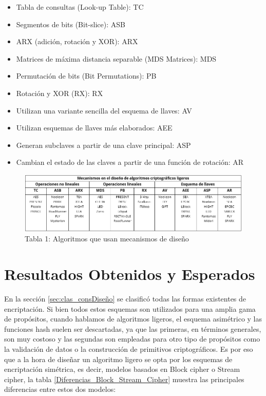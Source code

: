 \documentclass[a4paper,10pt]{article}
\begin{document}
	\begin{itemize}
		\item Tabla de consultas (Look-up Table): TC
		\item Segmentos de bits (Bit-slice): ASB
		\item ARX (adición, rotación y XOR): ARX
		\item Matrices de máxima distancia separable (MDS Matrices): MDS
		\item Permutación de bits (Bit Permutations): PB
		\item Rotación y XOR (RX): RX
		\item Utilizan una variante sencilla del esquema de llaves: AV
		\item Utilizan esquemas de llaves más elaborados: AEE
		\item Generan subclaves a partir de una clave principal: ASP
		\item Cambian el estado de las claves a partir de una función de rotación: AR	
	\end{itemize}
	\begin{figure}[h]
		\centering
		\includegraphics[width=1.0\textwidth]{tablaAlgoritmosCriptografiaLigera.PNG}
		\caption{Tabla 1: Algoritmos que usan mecanismos de diseño}
		\label{algoritmosCriptografiaLigera}
	\end{figure}

	\section{Resultados Obtenidos y Esperados}
	En la sección \ref{sec:clas_consDiseño} se clasificó todas las formas existentes de encriptación. Si bien todos estos esquemas son utilizados para una amplia gama de propósitos, cuando hablamos de algoritmos ligeros, el esquema asimétrico y las funciones hash suelen ser descartadas, ya que las primeras, en términos generales, son muy costoso y las segundas son empleadas para otro tipo de propósitos como la validación de datos o la construcción de primitivos criptográficos. Es por eso que a la hora de diseñar un algoritmo ligero se opta por los esquemas de encriptación simétrica, es decir, modelos basados en Block cipher o Stream cipher, la tabla \ref{Diferencias_Block_Stream_Cipher} muestra las principales diferencias entre estos dos modelos:
	
\end{document}
